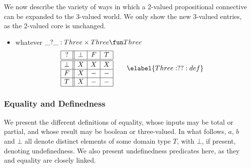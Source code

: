 We now describe the  variety of ways in which a 2-valued
propositional connective can be expanded to the 3-valued world.
We only show the new 3-valued entries, as the 2-valued core is unchanged.

\begin{itemize}
\item whatever $\_?\_ : Three\times Three \fun Three$
$$\begin{array}{|c||c|c|c|}
  \hline
  ?     & \bot & F    & T    \\\hline\hline
  \bot  & X    & X    & X    \\\hline
  F     & X    & -    & -    \\\hline
  T     & X    & -    & -    \\\hline
\end{array}
\qquad \elabel{Three:??:def}
$$
\end{itemize}

\subsubsection{Equality and Definedness}
We present the different definitions of equality,
whose inputs may be total or partial,
and whose result may be boolean or three-valued.
In what follows, $a$, $b$ and $\bot$ all denote distinct
elements of some domain type $T$, with $\bot$, if present,
denoting undefinedness.
We also present undefinedness predicates here,
as they and equality are closely linked.

